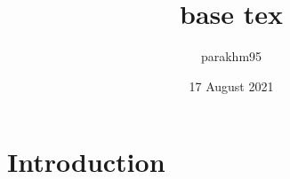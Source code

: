 \documentclass{article}
\title{base tex}
\author{parakhm95 }
\date{17 August 2021}
\begin{document}
\maketitle

\section{Introduction}
\end{document}
